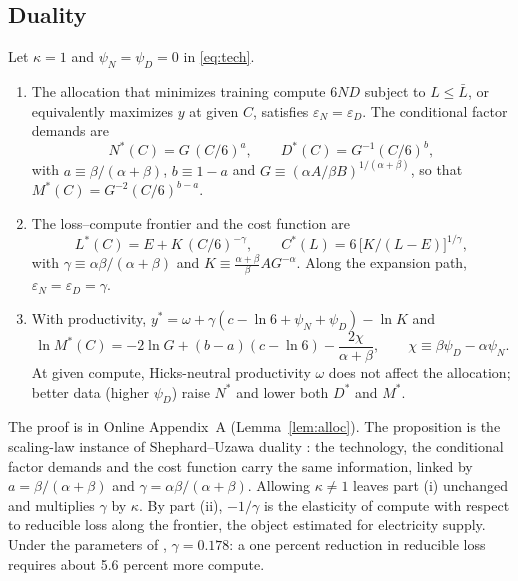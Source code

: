 

\subsection{Duality}\label{sec:framework:duality}

\begin{proposition}[Duality]\label{prop:duality}
Let $\kappa=1$ and $\psi_N=\psi_D=0$ in \eqref{eq:tech}.
\begin{enumerate}
\item[(i)] The allocation that minimizes training compute $6ND$ subject to $L\le\bar L$, or equivalently maximizes
$y$ at given $C$, satisfies $\varepsilon_N=\varepsilon_D$. The conditional factor demands are
\[
N^*(C)=G\,(C/6)^{a},\qquad D^*(C)=G^{-1}(C/6)^{b},
\]
with $a\equiv\beta/(\alpha+\beta)$, $b\equiv1-a$ and $G\equiv(\alpha A/\beta B)^{1/(\alpha+\beta)}$, so that
$M^*(C)=G^{-2}(C/6)^{b-a}$.
\item[(ii)] The loss--compute frontier and the cost function are
\[
L^*(C)=E+K\,(C/6)^{-\gamma},\qquad C^*(L)=6\,\big[K/(L-E)\big]^{1/\gamma},
\]
with $\gamma\equiv\alpha\beta/(\alpha+\beta)$ and $K\equiv\frac{\alpha+\beta}{\beta}AG^{-\alpha}$. Along the
expansion path, $\varepsilon_N=\varepsilon_D=\gamma$.
\item[(iii)] With productivity, $y^*=\omega+\gamma(c-\ln6+\psi_N+\psi_D)-\ln K$ and
\[
\ln M^*(C)=-2\ln G+(b-a)(c-\ln6)-\frac{2\chi}{\alpha+\beta},\qquad \chi\equiv\beta\psi_D-\alpha\psi_N .
\]
At given compute, Hicks-neutral productivity $\omega$ does not affect the allocation; better data (higher
$\psi_D$) raise $N^*$ and lower both $D^*$ and $M^*$.
\end{enumerate}
\end{proposition}

\noindent The proof is in Online Appendix~A (Lemma~\ref{lem:alloc}). The proposition is the scaling-law instance of
Shephard--Uzawa duality \citep{shephard1953cost,uzawa1964duality}: the technology, the conditional factor demands and
the cost function carry the same information, linked by $a=\beta/(\alpha+\beta)$ and
$\gamma=\alpha\beta/(\alpha+\beta)$. Allowing $\kappa\neq1$ leaves part (i) unchanged and multiplies $\gamma$ by
$\kappa$. By part (ii), $-1/\gamma$ is the elasticity of compute with respect to reducible loss along the frontier,
the object \citet{nerlove1963returns} estimated for electricity supply. Under the parameters of
\citet{besiroglu2024chinchilla}, $\gamma=0.178$: a one percent reduction in reducible loss requires about 5.6 percent
more compute.

